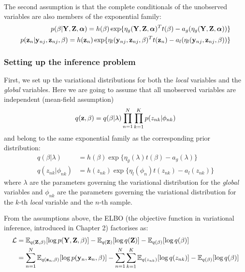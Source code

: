 The second assumption is that the complete conditionals of the unobserved variables are also members of the exponential family:
\begin{align} \label{eq_complete_conditionals} 
	\begin{split}
	p(\beta|{\bf Y},{\bf Z},\mbox{\boldmath $\alpha$}) = h(\beta) \exp\{ \eta_g({\bf Y},{\bf Z},\mbox{\boldmath $\alpha$})^T t(\beta) - a_g(\eta_g({\bf Y},{\bf Z},\mbox{\boldmath $\alpha$})) \} \\
	p({\bf z}_{n}|{\bf y}_{nj},{\bf z}_{nj},\beta) = h({\bf z}_{n}) \exp\{ \eta_l({\bf y}_{nj}, {\bf z}_{nj},\beta)^T t({\bf z}_{n}) - a_l(\eta_l({\bf y}_{nj},{\bf z}_{nj},\beta)) \}
	\end{split} 
\end{align}

\subsubsection{Setting up the inference problem}

 First, we set up the variational distributions for both the \textit{local} variables and the \textit{global} variables. Here we are going to assume that all unobserved variables are independent (mean-field assumption)
\[
	q({\bf z},\beta) = q(\beta|\lambda) \prod_{n=1}^{N} \prod_{k=1}^{K} p(z_{nk}|\phi_{nk})
\]
and belong to the same exponential family as the corresponding prior distribution:
\begin{align} \label{eq_variational_distributions}
	q(\beta|\lambda) &= h(\beta) \exp\{ \eta_g(\lambda) t(\beta) - a_g(\lambda) \} \\
	q(z_{nk}|\phi_{nk}) &= h(z_{nk}) \exp \{ \eta_l(\phi_{n}) t(z_{nk}) - a_l(z_{nk}) \}
\end{align}
where $\lambda$ are the parameters governing the variational distribution for the \textit{global} variables and $\phi_{nk}$ are the parameters governing the variational distribution for the $k$-th \textit{local} variable and the $n$-th sample.

From the assumptions above, the ELBO (the objective function in variational inference, introduced in Chapter 2) factorises as:
\begin{align} \label{eq_elbo_factorised} \begin{split}
	\mathcal{L} &= \mathbb{E}_{q({\bf Z},\beta)}[\log p({\bf Y},{\bf Z},\beta)] - \mathbb{E}_{q({\bf Z})}[\log q({\bf Z})] - \mathbb{E}_{q(\beta)}[\log q(\beta)] \\
	 &= \sum_{n=1}^{N} \mathbb{E}_{q({\bf z}_n,\beta)}[\log p({\bf y}_n,{\bf z}_n,\beta)] - \sum_{n=1}^{N} \sum_{k=1}^{K} \mathbb{E}_{q(z_{nk})}[\log q(z_{nk})] - \mathbb{E}_{q(\beta)}[\log q(\beta)]
\end{split} \end{align}


